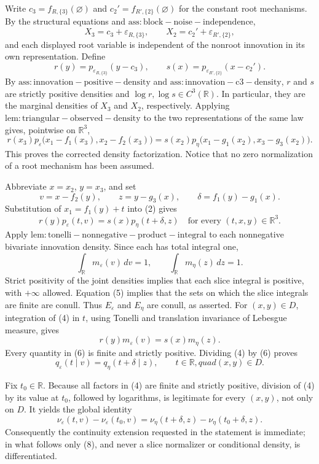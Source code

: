 Write \(c_3=f_{R,\{3\}}(\varnothing)\) and \(c_2'=f_{R',\{2\}}(\varnothing)\) for the constant root mechanisms.  By the structural equations and \(\mathrm{ass:block-noise-independence}\),
\[
 X_3=c_3+\varepsilon_{R,\{3\}},\qquad
 X_2=c_2'+\varepsilon_{R',\{2\}},
\]
and each displayed root variable is independent of the nonroot innovation in its own representation.  Define
\[
 r(y)=p_{\varepsilon_{R,\{3\}}}(y-c_3),
 \qquad
 s(x)=p_{\varepsilon_{R',\{2\}}}(x-c_2').
\tag{1}
\]
By \(\mathrm{ass:innovation-positive-density}\) and \(\mathrm{ass:innovation-c3-density}\), \(r\) and \(s\) are strictly positive densities and \(\log r,\log s\in C^3(\mathbb R)\).  In particular, they are the marginal densities of \(X_3\) and \(X_2\), respectively.  Applying \(\mathrm{lem:triangular-observed-density}\) to the two representations of the same law gives, pointwise on \(\mathbb R^3\),
\[
 r(x_3)p_\varepsilon\bigl(x_1-f_1(x_3),x_2-f_2(x_3)\bigr)
 =s(x_2)p_\eta\bigl(x_1-g_1(x_2),x_3-g_3(x_2)\bigr).
\tag{2}
\]
This proves the corrected density factorization.  Notice that no zero normalization of a root mechanism has been assumed.

Abbreviate \(x=x_2\), \(y=x_3\), and set
\[
 v=x-f_2(y),\qquad z=y-g_3(x),
 \qquad \delta=f_1(y)-g_1(x).
\tag{3}
\]
Substitution of \(x_1=f_1(y)+t\) into (2) gives
\[
 r(y)p_\varepsilon(t,v)=s(x)p_\eta(t+\delta,z)
 \quad\text{for every }(t,x,y)\in\mathbb R^3.
\tag{4}
\]
Apply \(\mathrm{lem:tonelli-nonnegative-product-integral}\) to each nonnegative bivariate innovation density.  Since each has total integral one,
\[
 \int_{\mathbb R}m_\varepsilon(v)\,dv=1,
 \qquad
 \int_{\mathbb R}m_\eta(z)\,dz=1.
\tag{5}
\]
Strict positivity of the joint densities implies that each slice integral is positive, with \(+\infty\) allowed.  Equation (5) implies that the sets on which the slice integrals are finite are conull.  Thus \(E_\varepsilon\) and \(E_\eta\) are conull, as asserted.  For \((x,y)\in D\), integration of (4) in \(t\), using Tonelli and translation invariance of Lebesgue measure, gives
\[
 r(y)m_\varepsilon(v)=s(x)m_\eta(z).
\tag{6}
\]
Every quantity in (6) is finite and strictly positive.  Dividing (4) by (6) proves
\[
 q_\varepsilon(t\mid v)=q_\eta(t+\delta\mid z),
 \qquad t\in\mathbb R,quad (x,y)\in D.
\tag{7}
\]

Fix \(t_0\in\mathbb R\).  Because all factors in (4) are finite and strictly positive, division of (4) by its value at \(t_0\), followed by logarithms, is legitimate for every \((x,y)\), not only on \(D\).  It yields the global identity
\[
 \nu_\varepsilon(t,v)-\nu_\varepsilon(t_0,v)
 =\nu_\eta(t+\delta,z)-\nu_\eta(t_0+\delta,z).
\tag{8}
\]
Consequently the continuity extension requested in the statement is immediate; in what follows only (8), and never a slice normalizer or conditional density, is differentiated.

